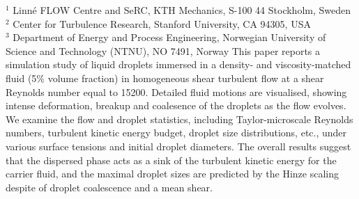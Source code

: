 %
%
%
%
%
%
%
\paperaffiliation
{%
  $^1$ Linn\'e FLOW Centre and SeRC, KTH Mechanics, S-100 44 Stockholm, Sweden\\%
  $^2$ Center for Turbulence Research, Stanford University, CA 94305, USA\\%
  $^3$ Department of Energy and Process Engineering, Norwegian University of Science and Technology (NTNU), NO 7491, Norway%
}%
%
%
%
%
%
\papernumber{}%
%
%
%
%
%
\papersummary%
{%
   This paper reports a simulation study of liquid droplets immersed in a density- and viscosity-matched fluid (5\% volume fraction)
   in homogeneous shear turbulent flow at a shear Reynolds number equal to 15200.
   Detailed fluid motions are visualised, showing intense deformation, breakup and coalesence of the droplets as the flow evolves.
   We examine the flow and droplet statistics, including Taylor-microscale Reynolds numbers, turbulent kinetic energy budget, droplet size distributions, etc.,
   under various surface tensions and initial droplet diameters.
   The overall results suggest that the dispersed phase acts as a sink of the turbulent kinetic energy for the carrier fluid, and
   the maximal droplet sizes are predicted by the Hinze scaling despite of droplet coalescence and a mean shear.
}%
%
\graphicspath{{paper5/}}%
%
%
%
